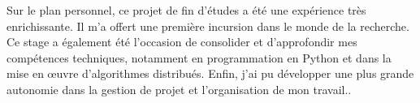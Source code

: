 Sur le plan personnel, ce projet de fin d'études a été une expérience très enrichissante. Il m'a offert une première incursion dans le monde de la recherche. Ce stage a également été l'occasion de consolider et d'approfondir mes compétences techniques, notamment en programmation en Python et dans la mise en œuvre d'algorithmes distribués. Enfin, j'ai pu développer une plus grande autonomie dans la gestion de projet et l'organisation de mon travail..
